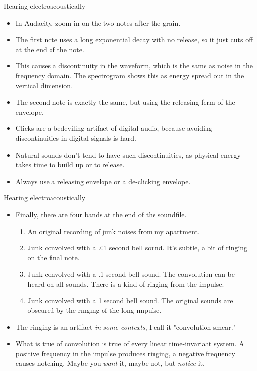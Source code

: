 \documentclass{beamer}
\begin{document}
\begin{frame}{Hearing electroacoustically}
\begin{itemize}
\item In Audacity, zoom in on the two notes after the grain.
\item The first note uses a long exponential decay with no release, so it just cuts off at the end of the note.
\item This causes a discontinuity in the waveform, which is the same as noise in the frequency domain. The spectrogram shows this as  energy spread out in the vertical dimension.
\item The second note is exactly the same, but using the releasing form of the envelope.
\item Clicks are a bedeviling artifact of digital audio, because avoiding discontinuities in digital signals is hard.
\item Natural sounds don't tend to have such discontinuities, as physical energy takes time to build up or to release.
\item Always use a releasing envelope or a de-clicking envelope.
\end{itemize}
\end{frame}

\begin{frame}{Hearing electroacoustically}
\begin{itemize}
\item Finally, there are four bands at the end of the soundfile.
\begin{enumerate}
\item An original recording of junk noises from my apartment.
\item Junk convolved with a .01 second bell sound. It's subtle, a bit of ringing on the final note.
\item Junk convolved with a .1 second bell sound. The convolution can be heard on all sounds. There is a kind of ringing from the impulse.
\item Junk convolved with a 1 second bell sound. The original sounds are obscured by the ringing of the long impulse.
\end{enumerate}
\item The ringing is an artifact \emph{in some contexts}, I call it "convolution smear."
\item What is true of convolution is true of every linear time-invariant system. A positive frequency in the impulse produces ringing, a negative frequency causes notching. Maybe you \emph{want} it, maybe not, but \emph{notice} it.
\end{itemize}
\end{frame}
\end{document}
